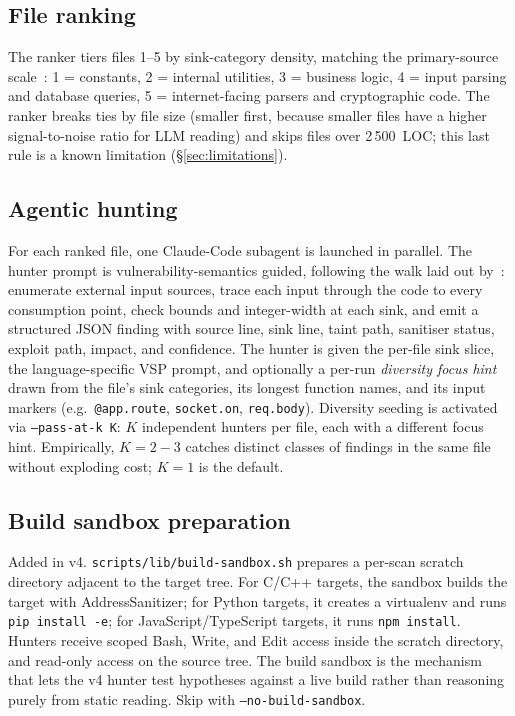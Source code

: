 \documentclass[11pt,a4paper]{article}
\begin{document}
\subsection{File ranking}

The ranker tiers files 1--5 by sink-category density, matching the
primary-source scale~\citep{anthropicMythos2026}: 1 = constants,
2 = internal utilities, 3 = business logic, 4 = input parsing and database
queries, 5 = internet-facing parsers and cryptographic code. The ranker
breaks ties by file size (smaller first, because smaller files have a
higher signal-to-noise ratio for LLM reading) and skips files over
2\,500~LOC; this last rule is a known limitation
(\S\ref{sec:limitations}).

\subsection{Agentic hunting}
\label{sec:approach-hunter}

For each ranked file, one Claude-Code subagent is launched in parallel.
The hunter prompt is vulnerability-semantics guided, following the walk
laid out by~\citet{vsp2024}: enumerate external input sources, trace each
input through the code to every consumption point, check bounds and
integer-width at each sink, and emit a structured JSON finding with source
line, sink line, taint path, sanitiser status, exploit path, impact, and
confidence. The hunter is given the per-file sink slice, the
language-specific VSP prompt, and optionally a per-run \emph{diversity
focus hint} drawn from the file's sink categories, its longest function
names, and its input markers (e.g.\ \texttt{@app.route},
\texttt{socket.on}, \texttt{req.body}). Diversity seeding is activated via
\texttt{--pass-at-k K}: $K$ independent hunters per file, each with a
different focus hint. Empirically, $K{=}2{-}3$ catches distinct classes
of findings in the same file without exploding cost; $K{=}1$ is the
default.

\subsection{Build sandbox preparation}
\label{sec:approach-sandbox}

Added in v4. \texttt{scripts/lib/build-sandbox.sh} prepares a per-scan
scratch directory adjacent to the target tree. For C/C++ targets, the
sandbox builds the target with AddressSanitizer; for Python targets, it
creates a virtualenv and runs \texttt{pip install -e}; for
JavaScript/TypeScript targets, it runs \texttt{npm install}. Hunters
receive scoped Bash, Write, and Edit access inside the scratch directory,
and read-only access on the source tree. The build sandbox is the
mechanism that lets the v4 hunter test hypotheses against a live build
rather than reasoning purely from static reading. Skip with
\texttt{--no-build-sandbox}.
\end{document}

